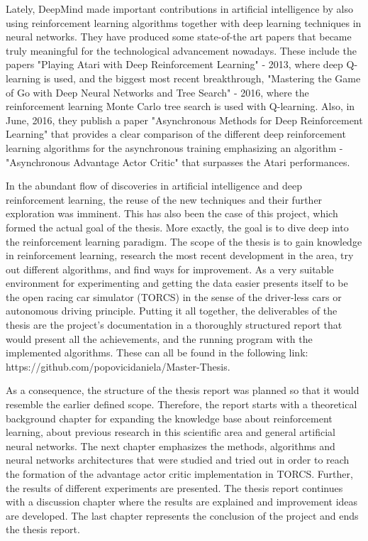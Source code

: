 Lately, DeepMind made important contributions in artificial intelligence by also using reinforcement learning algorithms together with deep learning techniques in neural networks. They have produced some state-of-the art papers that became truly meaningful for the technological advancement nowadays. These include the papers "Playing Atari with Deep Reinforcement Learning" \cite{DBLP:journals/corr/MnihKSGAWR13} - 2013, where deep Q-learning is used, and the biggest most recent breakthrough, "Mastering the Game of Go with Deep Neural Networks and Tree Search" \cite{Silver_2016} - 2016, where the reinforcement learning Monte Carlo tree search is used with Q-learning. Also, in June, 2016, they publish a paper "Asynchronous Methods for Deep Reinforcement Learning" \cite{DBLP:journals/corr/MnihBMGLHSK16} that provides a clear comparison of the different deep reinforcement learning algorithms for the asynchronous training emphasizing an algorithm - "Asynchronous Advantage Actor Critic" that surpasses the Atari performances.

In the abundant flow of discoveries in artificial intelligence and deep reinforcement learning, the reuse of the new techniques and their further exploration was imminent. This has also been the case of this project, which formed the actual goal of the thesis. More exactly, the goal is to dive deep into the reinforcement learning paradigm. The scope of the thesis is to gain knowledge in reinforcement learning, research the most recent development in the area, try out different algorithms, and find ways for improvement. As a very suitable environment for experimenting and getting the data easier presents itself to be the open racing car simulator (TORCS) in the sense of the driver-less cars or autonomous driving principle. Putting it all together, the deliverables of the thesis are the project's documentation in a thoroughly structured report that would present all the achievements, and the running program with the implemented algorithms. These can all be found in the following link: https://github.com/popovicidaniela/Master-Thesis.

As a consequence, the structure of the thesis report was planned so that it would resemble the earlier defined scope. Therefore, the report starts with a theoretical background chapter for expanding the knowledge base about reinforcement learning, about previous research in this scientific area and general artificial neural networks. The next chapter emphasizes the methods, algorithms and neural networks architectures that were studied and tried out in order to reach the formation of the advantage actor critic implementation in TORCS. Further, the results of different experiments are presented. The thesis report continues with a discussion chapter where the results are explained and improvement ideas are developed. The last chapter represents the conclusion of the project and ends the thesis report.